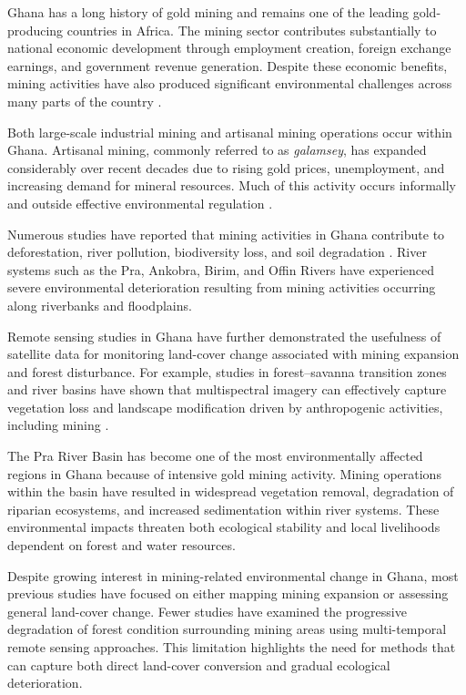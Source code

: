 \documentclass[a4paper,12pt]{report}
\begin{document}
Ghana has a long history of gold mining and remains one of the leading gold-producing countries in Africa. The mining sector contributes substantially to national economic development through employment creation, foreign exchange earnings, and government revenue generation. Despite these economic benefits, mining activities have also produced significant environmental challenges across many parts of the country \citep{hilson2002land,hilson2002environmental}.

Both large-scale industrial mining and artisanal mining operations occur within Ghana. Artisanal mining, commonly referred to as \textit{galamsey}, has expanded considerably over recent decades due to rising gold prices, unemployment, and increasing demand for mineral resources. Much of this activity occurs informally and outside effective environmental regulation \citep{mcquilken2016asm}.

Numerous studies have reported that mining activities in Ghana contribute to deforestation, river pollution, biodiversity loss, and soil degradation \citep{forkuor2012comparison,bansah2016hazardous}. River systems such as the Pra, Ankobra, Birim, and Offin Rivers have experienced severe environmental deterioration resulting from mining activities occurring along riverbanks and floodplains.

Remote sensing studies in Ghana have further demonstrated the usefulness of satellite data for monitoring land-cover change associated with mining expansion and forest disturbance. For example, studies in forest–savanna transition zones and river basins have shown that multispectral imagery can effectively capture vegetation loss and landscape modification driven by anthropogenic activities, including mining \citep{forkuor2012comparison,awotwi2018pra,gallwey2020sentinel}.

The Pra River Basin has become one of the most environmentally affected regions in Ghana because of intensive gold mining activity. Mining operations within the basin have resulted in widespread vegetation removal, degradation of riparian ecosystems, and increased sedimentation within river systems. These environmental impacts threaten both ecological stability and local livelihoods dependent on forest and water resources.

Despite growing interest in mining-related environmental change in Ghana, most previous studies have focused on either mapping mining expansion or assessing general land-cover change. Fewer studies have examined the progressive degradation of forest condition surrounding mining areas using multi-temporal remote sensing approaches. This limitation highlights the need for methods that can capture both direct land-cover conversion and gradual ecological deterioration.
\end{document}
